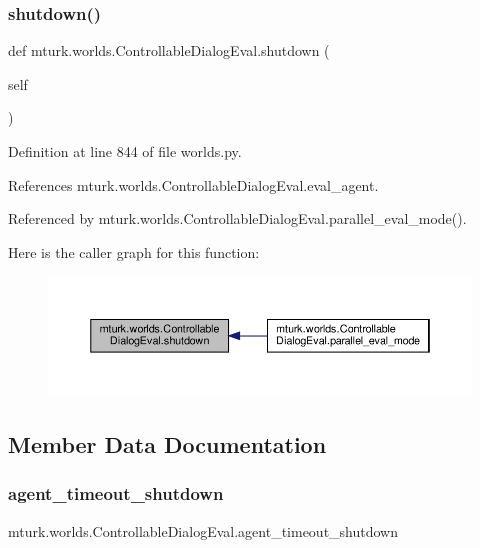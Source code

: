 \subsubsection{\texorpdfstring{shutdown()}{shutdown()}}
{\footnotesize\ttfamily def mturk.\+worlds.\+Controllable\+Dialog\+Eval.\+shutdown (\begin{DoxyParamCaption}\item[{}]{self }\end{DoxyParamCaption})}



Definition at line 844 of file worlds.\+py.



References mturk.\+worlds.\+Controllable\+Dialog\+Eval.\+eval\+\_\+agent.



Referenced by mturk.\+worlds.\+Controllable\+Dialog\+Eval.\+parallel\+\_\+eval\+\_\+mode().

Here is the caller graph for this function\+:
\nopagebreak
\begin{figure}[H]
\begin{center}
\leavevmode
\includegraphics[width=350pt]{classmturk_1_1worlds_1_1ControllableDialogEval_aa8888a3df7cb8610c0bde2d826557d99_icgraph}
\end{center}
\end{figure}


\subsection{Member Data Documentation}
\mbox{\label{classmturk_1_1worlds_1_1ControllableDialogEval_a53c001c4f6690abc729f5490d6aee0e6}} 
\subsubsection{\texorpdfstring{agent\+\_\+timeout\+\_\+shutdown}{agent\_timeout\_shutdown}}
{\footnotesize\ttfamily mturk.\+worlds.\+Controllable\+Dialog\+Eval.\+agent\+\_\+timeout\+\_\+shutdown}



